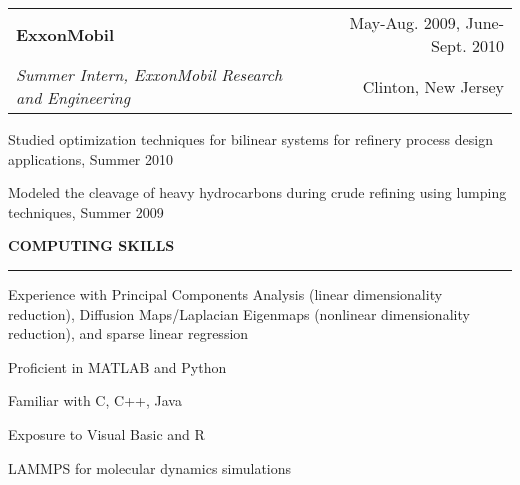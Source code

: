 \documentclass[letterpaper,10pt]{article}
\makeatletter
\newenvironment{itemize*}
  {\begin{itemize}
    \setlength{\parskip}{-2pt}}
  {\end{itemize}}
\newcommand{\cvheading}[1]{
\vspace{0.11in}
\noindent
\MakeUppercase{\bf #1}
\vspace{0.06in}
{\hrule height 0.3mm}
\vspace{0.06in}}
\newcommand{\workplace}[4]{
\noindent
\vspace{0.012in}
\begin{tabular*}{1.0\textwidth}{@{\extracolsep{\fill}} l r}
{\bf #1} & #2\\
{\em #3} & #4\\
\end{tabular*}
\vspace{-0.15in}
}
\makeatother
\begin{document}
\workplace{ExxonMobil}{May-Aug. 2009, June-Sept. 2010}{Summer Intern, ExxonMobil Research and Engineering}{Clinton, New Jersey}
\begin{itemize*}
\item Studied optimization techniques for bilinear systems for refinery process design applications, Summer 2010
\item Modeled the cleavage of heavy hydrocarbons during crude refining using lumping techniques, Summer 2009
\end{itemize*}

\cvheading{Computing Skills}
\begin{itemize*}
\item Experience with Principal Components Analysis (linear dimensionality reduction), Diffusion Maps/Laplacian Eigenmaps (nonlinear dimensionality reduction), and sparse linear regression
\item Proficient in MATLAB and Python
\item Familiar with C, C++, Java
\item Exposure to Visual Basic and R
\item LAMMPS for molecular dynamics simulations
\end{itemize*}
\end{document}
